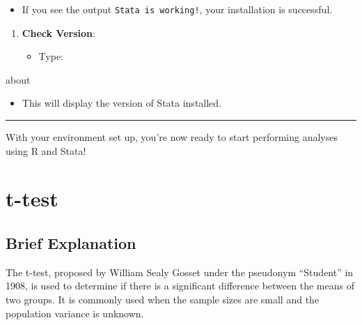 \documentclass[
  letterpaper,
  DIV=11,
  numbers=noendperiod]{scrreprt}
\newenvironment{Shaded}{\begin{snugshade}}{\end{snugshade}}
\newcommand{\NormalTok}[1]{\textcolor[rgb]{0.00,0.23,0.31}{#1}}
\providecommand{\tightlist}{%
  \setlength{\itemsep}{0pt}\setlength{\parskip}{0pt}}\usepackage{longtable,booktabs,array}
\begin{document}
\begin{itemize}
\tightlist
\item
  If you see the output \texttt{Stata\ is\ working!}, your installation
  is successful.
\end{itemize}

\begin{enumerate}
\def\labelenumi{\arabic{enumi}.}
\setcounter{enumi}{1}
\tightlist
\item
  \textbf{Check Version}:

  \begin{itemize}
  \tightlist
  \item
    Type:
  \end{itemize}
\end{enumerate}

\begin{Shaded}
\begin{Highlighting}[]
\NormalTok{   about}
\end{Highlighting}
\end{Shaded}

\begin{itemize}
\tightlist
\item
  This will display the version of Stata installed.
\end{itemize}

\begin{center}\rule{0.5\linewidth}{0.5pt}\end{center}

With your environment set up, you're now ready to start performing
analyses using R and Stata!


\chapter{t-test}\label{t-test}

\section{Brief Explanation}\label{brief-explanation}

The t-test, proposed by William Sealy Gosset under the pseudonym
``Student'' in 1908, is used to determine if there is a significant
difference between the means of two groups. It is commonly used when the
sample sizes are small and the population variance is unknown.
\end{document}
